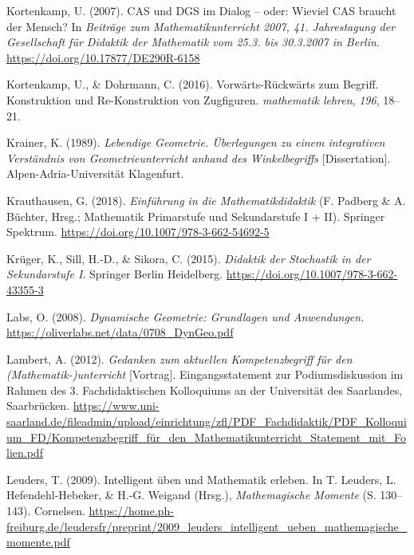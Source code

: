 \documentclass[
]{scrbook}
\newlength{\cslhangindent}
\newenvironment{CSLReferences}[2] %
 {\begin{list}{}{%
  \setlength{\itemindent}{0pt}
  \setlength{\leftmargin}{0pt}
  \setlength{\parsep}{0pt}
  \ifodd #1
   \setlength{\leftmargin}{\cslhangindent}
   \setlength{\itemindent}{-1\cslhangindent}
  \fi
  \setlength{\itemsep}{#2\baselineskip}}}
 {\end{list}}
\theoremstyle{definition}
\theoremstyle{definition}
\theoremstyle{definition}
\theoremstyle{definition}
\theoremstyle{remark}
\begin{document}
\begin{CSLReferences}{1}{0}
Kortenkamp, U. (2007). {CAS} und {DGS} im {Dialog} -- oder: {Wieviel} {CAS} braucht der {Mensch}? In \emph{Beiträge zum {Mathematikunterricht} 2007, 41. {Jahrestagung} der {Gesellschaft} für {Didaktik} der {Mathematik} vom 25.3. bis 30.3.2007 in {Berlin}}. \url{https://doi.org/10.17877/DE290R-6158}

Kortenkamp, U., \& Dohrmann, C. (2016). Vorwärts-{Rückwärts} zum {Begriff}. {Konstruktion} und {Re}-{Konstruktion} von {Zugfiguren}. \emph{mathematik lehren}, \emph{196}, 18--21.

Krainer, K. (1989). \emph{Lebendige {Geometrie}. Überlegungen zu einem integrativen {Verständnis} von {Geometrieunterricht} anhand des {Winkelbegriffs}} {[}Dissertation{]}. Alpen-Adria-Universität Klagenfurt.

Krauthausen, G. (2018). \emph{Einführung in die {Mathematikdidaktik}} (F. Padberg \& A. Büchter, Hrsg.; Mathematik Primarstufe und Sekundarstufe I + II). Springer Spektrum. \url{https://doi.org/10.1007/978-3-662-54692-5}

Krüger, K., Sill, H.-D., \& Sikora, C. (2015). \emph{Didaktik der {Stochastik} in der {Sekundarstufe} {I}}. Springer Berlin Heidelberg. \url{https://doi.org/10.1007/978-3-662-43355-3}

Labs, O. (2008). \emph{Dynamische {Geometrie}: {Grundlagen} und {Anwendungen}.} \url{https://oliverlabs.net/data/0708_DynGeo.pdf}

Lambert, A. (2012). \emph{Gedanken zum aktuellen {Kompetenzbegriff} für den ({Mathematik}-)unterricht} {[}Vortrag{]}. Eingangsstatement zur Podiumsdiskussion im Rahmen des 3. Fachdidaktischen Kolloquiums an der Universität des Saarlandes, Saarbrücken. \url{https://www.uni-saarland.de/fileadmin/upload/einrichtung/zfl/PDF_Fachdidaktik/PDF_Kolloquium_FD/Kompetenzbegriff_für_den_Mathematikunterricht_Statement_mit_Folien.pdf}

Leuders, T. (2009). Intelligent üben und {Mathematik} erleben. In T. Leuders, L. Hefendehl-Hebeker, \& H.-G. Weigand (Hrsg.), \emph{Mathemagische {Momente}} (S. 130--143). Cornelsen. \url{https://home.ph-freiburg.de/leudersfr/preprint/2009_leuders_intelligent_ueben_mathemagische_momente.pdf}


\end{CSLReferences}
\end{document}

